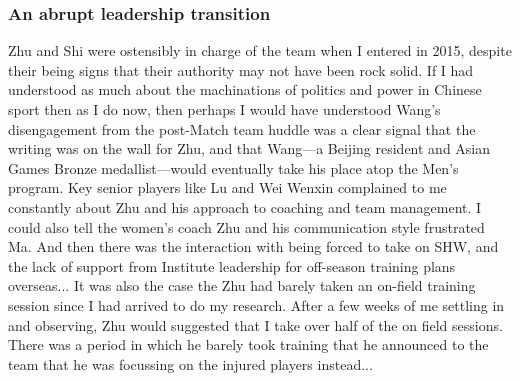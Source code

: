 


  \subsubsection{An abrupt leadership transition}
  Zhu and Shi were ostensibly in charge of the team when I entered in 2015, despite their being signs that their authority may not have been rock solid.  If I had understood as much about the machinations of politics and power in Chinese sport then as I do now, then perhaps I would have understood Wang's disengagement from the post-Match team huddle was a clear signal that the writing was on the wall for Zhu, and that Wang---a Beijing resident and Asian Games Bronze medallist---would eventually take his place atop the Men's program.  Key senior players like Lu and Wei Wenxin complained to me constantly about Zhu and his approach to coaching and team management.  I could also tell the women's coach Zhu and his communication style frustrated Ma.  And then there was the interaction with being forced to take on SHW, and the lack of support from Institute leadership for off-season training plans overseas... It was also the case the Zhu had barely taken an on-field training session since I had arrived to do my research.  After a few weeks of me settling in and observing, Zhu would suggested that I take over half of the on field sessions.  There was a period in which he barely took training that he announced to the team that he was focussing on the injured players instead...

